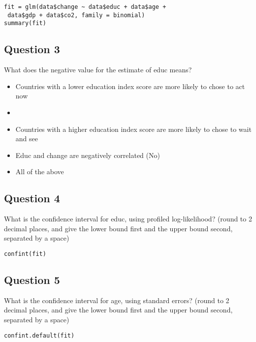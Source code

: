 \documentclass[12pt]{article}
\begin{document}
\begin{framed}
\begin{verbatim}
fit = glm(data$change ~ data$educ + data$age + 
 data$gdp + data$co2, family = binomial) 
summary(fit)
\end{verbatim}
\end{framed}
\subsection*{Question 3}

What does the negative value for the estimate of educ means?

\begin{itemize}
\item Countries with a lower education index score are more likely to chose to act now			
\item 
\item Countries with a higher education index score are more likely to chose to wait and see			
\item Educ and change are negatively correlated	(No)
\item All of the above
\end{itemize}

\subsection*{Question 4}
What is the confidence interval for educ, using profiled log-likelihood? (round to 2 decimal places, and give the lower bound first and the upper bound second, separated by a space)
	
\begin{framed}
\begin{verbatim}
confint(fit)
\end{verbatim}
\end{framed}
\subsection*{Question 5}
What is the confidence interval for age, using standard errors? (round to 2 decimal places, and give the lower bound first and the upper bound second, separated by a space)
\begin{framed}
\begin{verbatim}
confint.default(fit)
\end{verbatim}
\end{framed}
\end{document}
